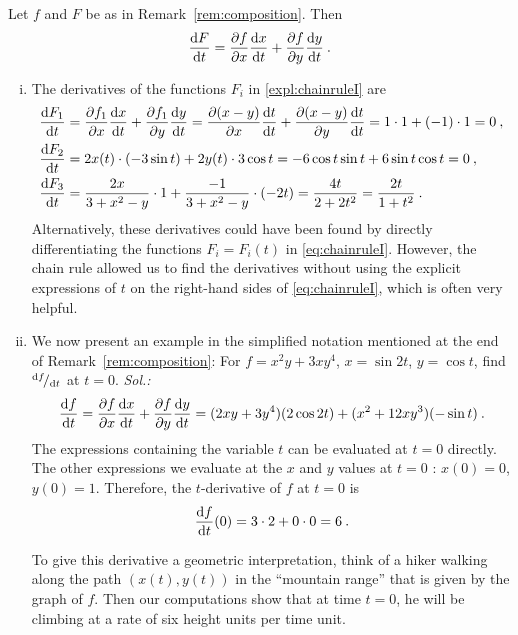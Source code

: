 \begin{theorem}
\label{thm:CRI}
Let $f$ and $F$ be as in Remark~\ref{rem:composition}. Then
\[ \displaystyle{\frac{\mathrm{d}F}{\mathrm{d}t}} = \displaystyle{\frac{\partial f}{\partial x}} \displaystyle{\frac{\mathrm{d}x}{\mathrm{d}t}} + \displaystyle{\frac{\partial f}{\partial y}} \displaystyle{\frac{\mathrm{d}y}{\mathrm{d}t}} \:. \]
\end{theorem}

\begin{example}
\label{expl:chain_rule_i}
\begin{enumerate}[(i)]
	\item The derivatives of the functions $F_i$ in \ref{expl:chainruleI} are
\begin{equation*}
\begin{split}
\displaystyle{\frac{\mathrm{d}F_1}{\mathrm{d}t}} & = \displaystyle{\frac{\partial f_1}{\partial x}} \displaystyle{\frac{\mathrm{d}x}{\mathrm{d}t}} + \displaystyle{\frac{\partial f_1}{\partial y}} \displaystyle{\frac{\mathrm{d}y}{\mathrm{d}t}} 
= \displaystyle{\frac{\partial (x-y)}{\partial x}} \displaystyle{\frac{\mathrm{d}t}{\mathrm{d}t}} + \displaystyle{\frac{\partial (x-y)}{\partial y}} \displaystyle{\frac{\mathrm{d}t}{\mathrm{d}t}} = 1 \cdot 1 + (-1)\cdot 1 = 0 \:, \\
\displaystyle{\frac{\mathrm{d}F_2}{\mathrm{d}t}} & 
= 2x(t) \cdot (-3\sin t) + 2y(t) \cdot 3\cos t = -6 \cos t \sin t + 6 \sin t \cos t = 0 \:,  \\
\displaystyle{\frac{\mathrm{d}F_3}{\mathrm{d}t}} & = \frac{2x}{3+x^2-y} \cdot 1 + \frac{-1}{3+x^2-y} \cdot (-2t) 
= \frac{4t}{2+2t^2} = \frac{2t}{1+t^2} \:.
\end{split}
\end{equation*}
Alternatively, these derivatives could have been found by directly differentiating the functions $F_i=F_i(t)$ in \eqref{eq:chainruleI}. However, the chain rule allowed us to find the derivatives without using the explicit expressions of $t$ on the right-hand sides of \eqref{eq:chainruleI}, which is often very helpful.
	\item We now present an example in the simplified notation mentioned at the end of Remark~\ref{rem:composition}: For $f=x^2 y + 3x y^4$, $x=\sin 2 t$, $y= \cos t$,  find ${}^{\mathrm{d} f}\!/_{\mathrm{d} t}$ at $t=0$.
	{\it Sol.:}
\[ \displaystyle{\frac{\mathrm{d}f}{\mathrm{d}t}} = \displaystyle{\frac{\partial f}{\partial x}} \displaystyle{\frac{\mathrm{d}x}{\mathrm{d}t}} + \displaystyle{\frac{\partial f}{\partial y}}\displaystyle{\frac{\mathrm{d}y}{\mathrm{d}t}} 
= (2xy+ 3y^4)(2\cos 2t)+(x^2+12 xy^3)(-\sin t) \:. \]
The expressions containing the variable $t$ can be evaluated at $t=0$ directly. The other expressions we evaluate at the $x$ and $y$ values at $t=0$ : $x(0)=0$, $y(0)=1$. Therefore, the $t$-derivative of $f$ at $t=0$ is
\[ \displaystyle{\frac{\mathrm{d}f}{\mathrm{d}t}}(0) = 3\cdot 2 + 0 \cdot 0 = 6 \:. \]

To give this derivative a geometric interpretation, think of a hiker walking along the path $(x(t),y(t))$ in the ``mountain range'' that is given by the graph of $f$. Then our computations show that at time $t=0$, he will be climbing at a rate of six height units per time unit.
\end{enumerate}
\end{example}

